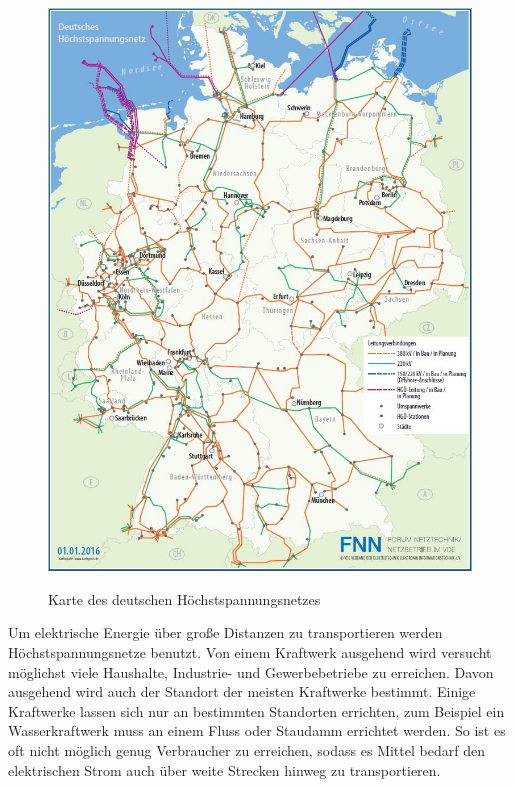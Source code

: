 \begin{figure}[t]
	\centering
	{\includegraphics[scale=0.5]{bilder/hochstspannungsnetz}\label{fig_hochstspannungsnetz}
	}\\
	\caption[Karte des deutschen Höchstspannungsnetzes]{Karte des deutschen Höchstspannungsnetzes}
	\label{fig_hochstspannungsnetz2}
\end{figure}
Um elektrische Energie über große Distanzen zu transportieren werden Höchstspannungsnetze benutzt. Von einem Kraftwerk ausgehend wird versucht möglichst viele Haushalte, Industrie- und Gewerbebetriebe zu erreichen. Davon ausgehend wird auch der Standort der meisten Kraftwerke bestimmt. Einige Kraftwerke lassen sich nur an bestimmten Standorten errichten, zum Beispiel ein Wasserkraftwerk muss an einem Fluss oder Staudamm errichtet werden. So ist es oft nicht möglich genug Verbraucher zu erreichen, sodass es Mittel bedarf den elektrischen Strom auch über weite Strecken hinweg zu transportieren.

